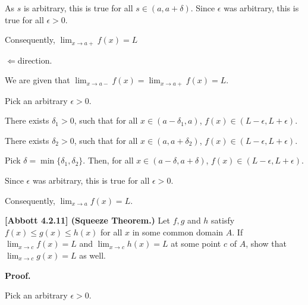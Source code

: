 \documentclass[10pt]{article}
\begin{document}
As $\displaystyle s$ is arbitrary, this is true for all $\displaystyle s\in ( a,a+\delta )$. Since $\displaystyle \epsilon $ was arbitrary, this is true for all $\displaystyle \epsilon  >0$.



Consequently, $\displaystyle \lim _{x\rightarrow a+} f( x) =L$



$\displaystyle \Longleftarrow $direction.



We are given that $\displaystyle \lim _{x\rightarrow a-} f( x) =\lim _{x\rightarrow a+} f( x) =L$. 



Pick an arbitrary $\displaystyle \epsilon  >0$.



There exists $\displaystyle \delta _{1}  >0$, such that for all $\displaystyle x\in ( a-\delta _{1} ,a)$, $\displaystyle f( x) \in ( L-\epsilon ,L+\epsilon )$.



There exists $\displaystyle \delta _{2}  >0$, such that for all $\displaystyle x\in ( a,a+\delta _{2})$, $\displaystyle f( x) \in ( L-\epsilon ,L+\epsilon )$.



Pick $\displaystyle \delta =\min\{\delta _{1} ,\delta _{2}\}$. Then, for all $\displaystyle x\in ( a-\delta ,a+\delta )$, $\displaystyle f( x) \in ( L-\epsilon ,L+\epsilon )$.



Since $\displaystyle \epsilon $ was arbitrary, this is true for all $\displaystyle \epsilon  >0$.



Consequently, $\displaystyle \lim _{x\rightarrow a} f( x) =L$.



\textbf{[Abbott 4.2.11] (Squeeze Theorem.)} Let $\displaystyle f,g$ and $\displaystyle h$ satisfy $\displaystyle f( x) \leq g( x) \leq h( x)$ for all $\displaystyle x$ in some common domain $\displaystyle A$. If $\displaystyle \lim _{x\rightarrow c} f( x) =L$ and $\displaystyle \lim _{x\rightarrow c} h( x) =L$ at some point $\displaystyle c$ of $\displaystyle A$, show that $\displaystyle \lim _{x\rightarrow c} g( x) =L$ as well. 



\textbf{Proof.}



Pick an arbitrary $\displaystyle \epsilon  >0$. 
\end{document}
